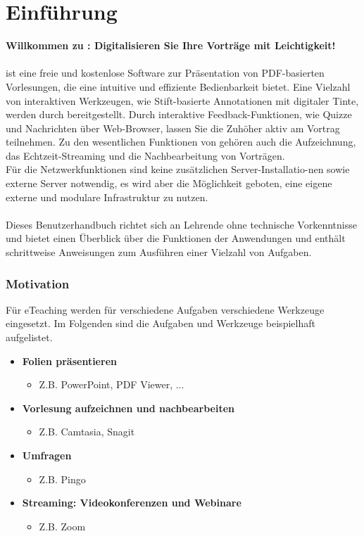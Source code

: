 \chapter{Einführung}
\large\textbf{Willkommen zu \lectStudio{}: Digitalisieren Sie Ihre Vorträge mit Leichtigkeit!}
\\\\
\lectStudio{} ist eine freie und kostenlose Software zur Präsentation von PDF-basierten Vorlesungen, die eine intuitive und effiziente Bedienbarkeit bietet. Eine Vielzahl von interaktiven Werkzeugen, wie Stift-basierte Annotationen mit digitaler Tinte, werden durch \lectStudio{} bereitgestellt. Durch interaktive Feedback-Funktionen, wie Quizze und Nachrichten über Web-Browser, lassen Sie die Zuhöher aktiv am Vortrag teilnehmen. Zu den wesentlichen Funktionen von \lectStudio{} gehören auch die Aufzeichnung, das Echtzeit-Streaming und die Nachbearbeitung von Vorträgen.
\\
Für die Netzwerkfunktionen sind keine zusätzlichen Server-Installatio-nen sowie externe Server notwendig, es wird aber die Möglichkeit geboten, eine eigene externe und modulare Infrastruktur zu nutzen.
\\\\
Dieses Benutzerhandbuch richtet sich an Lehrende ohne technische Vorkenntnisse und bietet einen Überblick über die Funktionen der Anwendungen und enthält schrittweise Anweisungen zum Ausführen einer Vielzahl von Aufgaben.


\subsection*{Motivation}
Für eTeaching werden für verschiedene Aufgaben verschiedene Werkzeuge eingesetzt. Im Folgenden sind die Aufgaben und Werkzeuge beispielhaft aufgelistet.

\begin{itemize}
	\item \textbf{Folien präsentieren}
	\begin{itemize}
		\item Z.B. PowerPoint, PDF Viewer, ...
	\end{itemize}

	\item \textbf{Vorlesung aufzeichnen und nachbearbeiten}
	\begin{itemize}
		\item Z.B. Camtasia, Snagit
	\end{itemize}

	\item \textbf{Umfragen}
	\begin{itemize}
		\item Z.B. Pingo
	\end{itemize}

	\item \textbf{Streaming: Videokonferenzen und Webinare}
	\begin{itemize}
		\item Z.B. Zoom
	\end{itemize}
\end{itemize}

